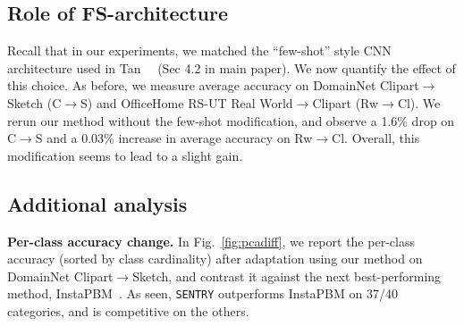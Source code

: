 \documentclass[10pt,twocolumn,letterpaper]{article}
\newcommand{\method}{\texttt{SENTRY}\xspace}
\begin{document}
\begin{table}[t]
    \begin{center} 
    \caption{Ablating class balancing. Gray row=\method. CB=class balancing. subscript=improvement v/s row 1.}
  
    \label{tab:ablate_cb}   
    \end{center}
    \vspace{-15pt}
 \end{table}

\subsection{Role of FS-architecture} 
 
\noindent Recall that in our experiments, we matched the ``few-shot'' style CNN architecture used in Tan~\etal~\cite{tan2019generalized} (Sec 4.2 in main paper). We now quantify the effect of this choice. As before, we measure average accuracy on DomainNet Clipart$\rightarrow$Sketch (C$\rightarrow$S) and OfficeHome RS-UT Real World$\rightarrow$Clipart (Rw$\rightarrow$Cl). We rerun our method without the few-shot modification, and observe a 1.6\% drop on C$\rightarrow$S and a 0.03\% increase in average accuracy on Rw$\rightarrow$Cl. Overall, this modification seems to lead to a slight gain.


\subsection{Additional analysis} 

\par\noindent \textbf{Per-class accuracy change.} In Fig.~\ref{fig:pcadiff}, we report the per-class accuracy (sorted by class cardinality) after adaptation using our method on DomainNet Clipart$\to$Sketch, and contrast it against the next best-performing method, InstaPBM~\cite{li2020rethinking}. As seen, \method outperforms InstaPBM on 37/40 categories, and is competitive on the others.
\end{document}
